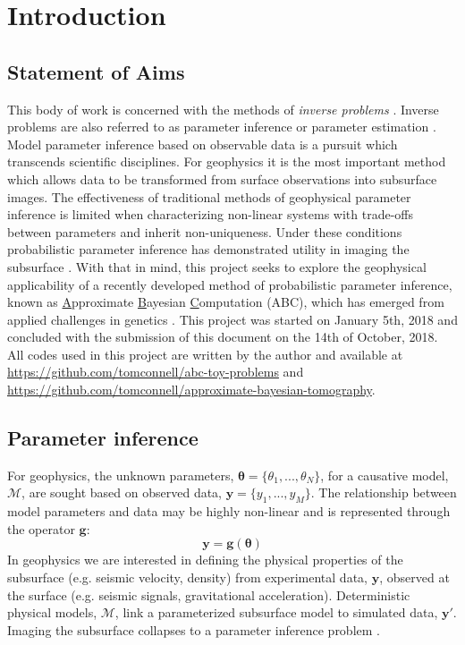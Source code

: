 \chapter{Introduction}


\section{Statement of Aims} 

This body of work is concerned with the methods of \textit{inverse problems} \citep{Tarantola2005,Aster2013,Menke2012,Kaipio2006,Biegler2010,Idier2013}. Inverse problems are also referred to as parameter inference or parameter estimation \citep{Box1973,Sprott2008,Casella1993,Cox2007}. Model parameter inference based on observable data is a pursuit which transcends scientific disciplines. For geophysics it is the most important method which allows data to be transformed from surface observations into subsurface images. The effectiveness of traditional methods of geophysical parameter inference is limited when characterizing non-linear systems with trade-offs between parameters and inherit non-uniqueness. Under these conditions probabilistic parameter inference has demonstrated utility in imaging the subsurface \citep{Tarantola2005}. With that in mind, this project seeks to explore the geophysical applicability of a recently developed method of probabilistic parameter inference, known as \underline{A}pproximate \underline{B}ayesian \underline{C}omputation (ABC), which has emerged from applied challenges in genetics \citep{Tavare1997,Beaumont2002,Sunnaker2013}. This project was started on January 5th, 2018 and concluded with the submission of this document on the 14th of October, 2018. All codes used in this project are written by the author and available at \url{https://github.com/tomconnell/abc-toy-problems} and \url{https://github.com/tomconnell/approximate-bayesian-tomography}.

\section{Parameter inference}

For geophysics, the unknown parameters, $\bm{\theta} = \{\theta_1,...,\theta_N\}$, for a causative model, $\mathcal{M}$, are sought based on observed data, $\bm{y} = \{y_1,...,y_M\}$. The relationship between model parameters and data may be highly non-linear and is represented through the operator $\bm{g}$:
\begin{equation}
\bm{y} = \bm{g}(\bm{\theta})
\label{basic_data_parameters}
\end{equation}
In geophysics we are interested in defining the physical properties  of the subsurface (e.g. seismic velocity, density) from experimental data, $\bm{y}$, observed at the surface (e.g. seismic signals, gravitational acceleration). Deterministic physical models, $\mathcal{M}$, link a parameterized subsurface model to simulated data, $\bm{y'}$. Imaging the subsurface collapses to a parameter inference problem \citep[p.1-2]{Tarantola2005}.\par


